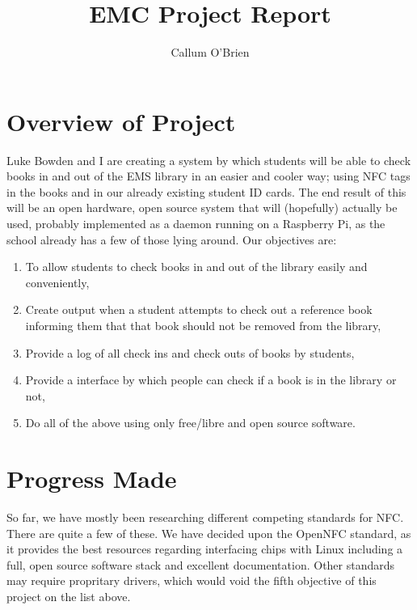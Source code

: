 \documentclass{article}
\begin{document}
\title{EMC Project Report}
\author{Callum O'Brien}
\maketitle

\section{Overview of Project}

Luke Bowden and I are creating a system by which students will be able to check
books in and out of the EMS library in an easier and cooler way; using NFC tags
in the books and in our already existing student ID cards. The end result of
this will be an open hardware, open source system that will (hopefully) actually
be used, probably implemented as a daemon running on a Raspberry Pi, as the
school already has a few of those lying around. Our objectives
are:\begin{enumerate}

    \item To allow students to check books in and out of the library easily and
        conveniently,

    \item Create output when a student attempts to check out a reference book
        informing them that that book should not be removed from the library,

    \item Provide a log of all check ins and check outs of books by students,

    \item Provide a interface by which people can check if a book is in the
        library or not,

    \item Do all of the above using only free/libre and open source software.

\end{enumerate}

\section{Progress Made}

So far, we have mostly been researching different competing standards for NFC.
There are quite a few of these. We have decided upon the OpenNFC standard, as it
provides the best resources regarding interfacing chips with Linux including a
full, open source software stack and excellent documentation. Other standards
may require propritary drivers, which would void the fifth objective of this
project on the list above.
\end{document}
